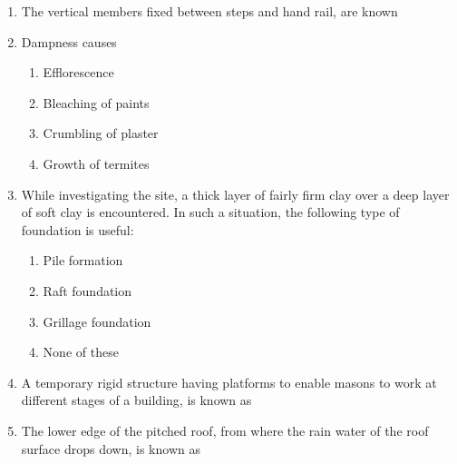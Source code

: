 \documentclass[11pt,a4paper]{article}
\begin{document}
\begin{enumerate}
\item{The vertical members fixed between steps and hand rail, are known}
\\
\item{Dampness causes}
\begin{enumerate}[label=\Alph*.]
\item{Efflorescence}
\item{Bleaching of paints}
\item{Crumbling of plaster}
\item{Growth of termites}
\end{enumerate}
\item{While investigating the site, a thick layer of fairly firm clay over a deep layer of soft clay is encountered. In such a situation, the following type of foundation is useful:}
\begin{enumerate}[label=\Alph*.]
\item{Pile formation}
\item{Raft foundation}
\item{Grillage foundation}
\item{None of these}
\end{enumerate}
\item{A temporary rigid structure having platforms to enable masons to work at different stages of a building, is known as}
\\
\item{The lower edge of the pitched roof, from where the rain water of the roof surface drops down, is known as}

\end{enumerate}
\end{document}
